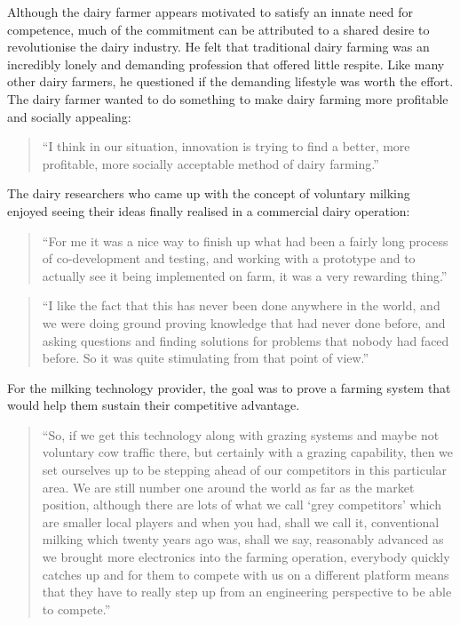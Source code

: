 Although the dairy farmer appears motivated to satisfy an innate need for competence, much of the commitment can be attributed to a shared desire to revolutionise the dairy industry. He felt that traditional dairy farming was an incredibly lonely and demanding profession that offered little respite. Like many other dairy farmers, he questioned if the demanding lifestyle was worth the effort. The dairy farmer wanted to do something to make dairy farming more profitable and socially appealing:

\begin{quote}
\small
\enquote{I think in our situation, innovation is trying to find a better, more profitable, more socially acceptable method of dairy farming.} \\
\end{quote}

The dairy researchers who came up with the concept of voluntary milking enjoyed seeing their ideas finally realised in a commercial dairy operation:

\begin{quote}
\small
\enquote{For me it was a nice way to finish up what had been a fairly long process of co-development and testing, and working with a prototype and to actually see it being implemented on farm, it was a very rewarding thing.} \\
\end{quote}

\begin{quote}
\small
\enquote{I like the fact that this has never been done anywhere in the world, and we were doing ground proving knowledge that had never done before, and asking questions and finding solutions for problems that nobody had faced before. So it was quite stimulating from that point of view.} \\
\end{quote}

For the milking technology provider, the goal was to prove a farming system that would help them sustain their competitive advantage. 

\begin{quote}
\small
\enquote{So, if we get this technology along with grazing systems and maybe not voluntary cow traffic there, but certainly with a grazing capability, then we set ourselves up to be stepping ahead of our competitors in this particular area. We are still number one around the world as far as the market position, although there are lots of what we call \enquote{grey competitors} which are smaller local players and when you had, shall we call it, conventional milking which twenty years ago was, shall we say, reasonably advanced as we brought more electronics into the farming operation, everybody quickly catches up and for them to compete with us on a different platform means that they have to really step up from an engineering perspective to be able to compete.} \\ 
\end{quote}

